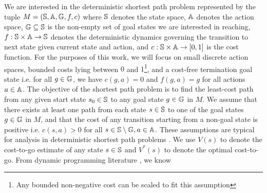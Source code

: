 We are interested in the deterministic shortest path problem
represented by the tuple $M = (\mathbb{S}, \mathbb{A}, \mathbb{G},
f, c)$ where $\mathbb{S}$ denotes the state space, $\mathbb{A}$
denotes the action space, $\mathbb{G} \subseteq \mathbb{S}$ is the
non-empty set of goal states we are
interested in reaching, $f: \mathbb{S} \times \mathbb{A}
\rightarrow \mathbb{S}$ denotes the deterministic dynamics governing
the transition to next state given current state and action, and $c:
\mathbb{S} \times \mathbb{A} \rightarrow [0, 1]$ is the cost
function. For the purposes of
this work, we will focus on small
discrete action spaces, bounded costs lying between $0$ and
$1$\footnote{Any bounded non-negative cost can be scaled to fit
  this assumption}, and a cost-free termination goal state i.e. for
all $g \in \mathbb{G}$, we have
$c(g, a) = 0$
and $f(g, a) = g$ for all actions $a \in \mathbb{A}$.
The objective of the shortest path problem is to find the least-cost path from any given start state $s_{0}
\in \mathbb{S}$ to any goal state $g \in \mathbb{G}$
in $M$.
We assume that there
exists at least one path from each state $s \in
\mathbb{S}$ to one of the goal states $g \in \mathbb{G}$ in $M$, and
that the
cost of any transition starting from a non-goal state is positive i.e. $c(s, a)
> 0$ for all $s \in \mathbb{S} \setminus \mathbb{G}, a \in
\mathbb{A}$. These assumptions are typical for analysis in
deterministic shortest path problems
\cite{DBLP:books/lib/Bertsekas05}. 
We use $V(s)$ to denote the cost-to-go estimate of any state $s \in
\mathbb{S}$ and $V^*(s)$ to denote the optimal cost-to-go. From
dynamic programming literature \cite{DBLP:books/lib/Bertsekas05}, we know
